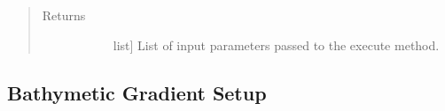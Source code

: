 \documentclass[letterpaper,10pt,english]{sphinxmanual}
\begin{document}
\begin{fulllineitems}
\begin{fulllineitems}
\begin{quote}
\begin{description}
\begin{description}
\end{description}

\item[{Returns}] \leavevmode\begin{description}
\item[{}] \leavevmode{[}list{]}
List of input parameters passed to the execute method.

\end{description}

\end{description}\end{quote}

\end{fulllineitems}


\end{fulllineitems}



\subsection{Bathymetic Gradient Setup}
\label{\detokenize{StreamStats_DataPrep:bathymetic-gradient-setup}}
\end{document}
